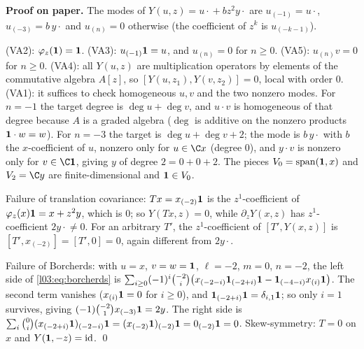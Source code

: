 \textbf{Proof on paper.} The modes of $Y(u,z) = u\cdot{} + bz^2y\cdot{}$ are $u_{(-1)} = u\cdot{}$,
$u_{(-3)} = b\,y\cdot{}$ and $u_{(n)} = 0$ otherwise (the coefficient of $z^k$ is $u_{(-k-1)}$).

(VA2): $\varphi_z(\mathbf{1}) = \mathbf{1}$. (VA3): $u_{(-1)}\mathbf{1} = u$, and $u_{(n)} = 0$ for
$n\ge0$. (VA5): $u_{(n)}v = 0$ for $n\ge0$. (VA4): all $Y(u,z)$ are multiplication operators by
elements of the commutative algebra $A[z]$, so $[Y(u,z_1),Y(v,z_2)] = 0$, local with order $0$.
(VA1): it suffices to check homogeneous $u,v$ and the two nonzero modes. For $n=-1$ the target
degree is $\deg u+\deg v$, and $u\cdot v$ is homogeneous of that degree because $A$ is a graded
algebra ($\deg$ is additive on the nonzero products $\mathbf{1}\cdot w = w$). For $n = -3$ the target is
$\deg u+\deg v+2$; the mode is $b\,y\cdot{}$ with $b$ the $x$-coefficient of $u$, nonzero only for
$u\in\C x$ (degree $0$), and $y\cdot v$ is nonzero only for $v\in\C\lthreevac$, giving $y$ of degree
$2 = 0+0+2$. The pieces $V_0 = \mathrm{span}(\mathbf{1},x)$ and $V_2 = \C y$ are finite-dimensional
and $\mathbf{1}\in V_0$.

Failure of translation covariance: $Tx = x_{(-2)}\mathbf{1}$ is the $z^1$-coefficient of
$\varphi_z(x)\mathbf{1} = x+z^2y$, which is $0$; so $Y(Tx,z) = 0$, while $\partial_zY(x,z)$ has
$z^1$-coefficient $2y\cdot{}\ne0$. For an arbitrary $T'$, the $z^1$-coefficient of $[T',Y(x,z)]$ is
$[T',x_{(-2)}] = [T',0] = 0$, again different from $2y\cdot{}$.

Failure of Borcherds: with $u = x$, $v = w = \mathbf{1}$, $\ell=-2$, $m=0$, $n=-2$, the left side of
\eqref{l03:eq:borcherds} is $\sum_{i\ge0}(-1)^i\binom{-2}{i}\big(x_{(-2-i)}\mathbf{1}_{(-2+i)}\mathbf{1} -
\mathbf{1}_{(-4-i)}x_{(i)}\mathbf{1}\big)$. The second term vanishes ($x_{(i)}\mathbf{1} = 0$ for $i\ge0$),
and $\mathbf{1}_{(-2+i)}\mathbf{1} = \delta_{i,1}\mathbf{1}$; so only $i = 1$ survives, giving
$(-1)\binom{-2}{1}x_{(-3)}\mathbf{1} = 2y$. The right side is $\sum_i\binom0i(x_{(-2+i)}\mathbf{1})_{(-2-i)}\mathbf{1}
= (x_{(-2)}\mathbf{1})_{(-2)}\mathbf{1} = 0_{(-2)}\mathbf{1} = 0$. Skew-symmetry: $T = 0$ on $x$ and
$Y(\mathbf{1},-z) = \mathrm{id}$. \qed

